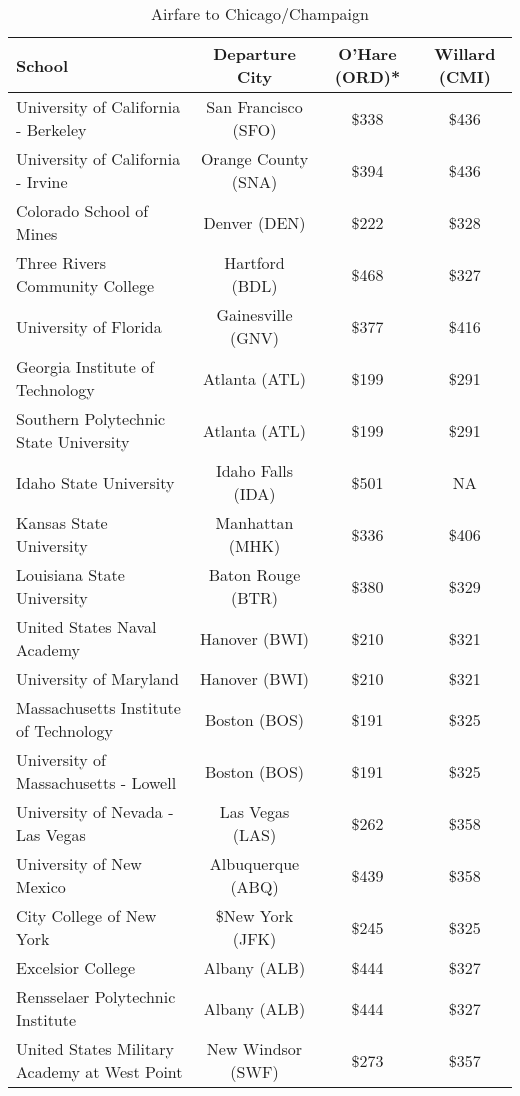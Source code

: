 \begin{table}[H]
\caption{Airfare to Chicago/Champaign}
\label{table:airfare}
   \begin{tabular}{lccc}
   	\hline\hline
    \textbf{School} & \textbf{Departure City} & \textbf{O'Hare (ORD)*} & \textbf{Willard (CMI)} \\
    \hline\hline
    University of California - Berkeley & San Francisco (SFO) & $\$$338 & $\$$436 \\
    University of California - Irvine&Orange County (SNA)&$\$$394&$\$$436\\
    Colorado School of Mines & Denver (DEN) & $\$$222 & $\$$328 \\
    Three Rivers Community College & Hartford (BDL) & $\$$468 & $\$$327 \\ 
    University of Florida & Gainesville (GNV)& $\$$377 & $\$$416 \\
    Georgia Institute of Technology & Atlanta (ATL)& $\$$199 & $\$$291 \\
    Southern Polytechnic State University & Atlanta (ATL) & $\$$199 & $\$$291 \\
    Idaho State University & Idaho Falls (IDA) & $\$$501 & NA \\
    Kansas State University & Manhattan (MHK) & $\$$336 & $\$$406 \\ 
    Louisiana State University & Baton Rouge (BTR) & $\$$380 & $\$$329 \\
    United States Naval Academy & Hanover (BWI) & $\$$210 & $\$$321 \\  
    University of Maryland & Hanover (BWI)&$\$$210 &$\$$321 \\ 
    Massachusetts Institute of Technology & Boston (BOS)&$\$$191 &$\$$325 \\ 
    University of Massachusetts - Lowell &Boston (BOS) &$\$$191 &$\$$325 \\
    University of Nevada - Las Vegas & Las Vegas (LAS)& $\$$262 &$\$$358 \\ 
    University of New Mexico &Albuquerque (ABQ) &$\$$439 &$\$$358 \\ 
    City College of New York &\$New York (JFK) &$\$$245 &$\$$325 \\
    Excelsior College & Albany (ALB) &$\$$444 &$\$$327 \\ 
    Rensselaer Polytechnic Institute & Albany (ALB)&$\$$444 &$\$$327 \\ 
    United States Military Academy at West Point&New Windsor (SWF)&$\$$273 &$\$$357 \\ 

\end{tabular}
\end{table}
